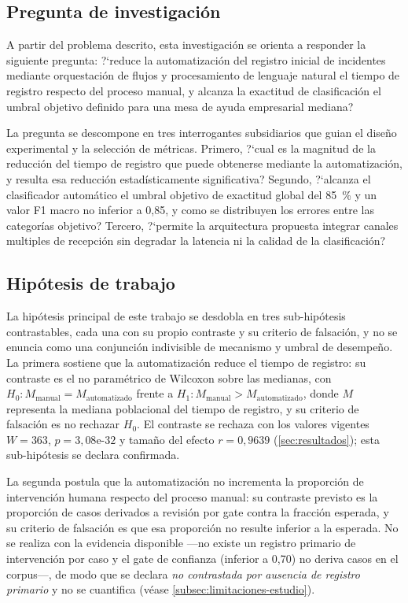\subsection{Pregunta de investigación}\label{subsec:pregunta-investigacion}

A partir del problema descrito, esta investigación se orienta a responder la siguiente pregunta: ?`reduce la automatización del registro inicial de incidentes mediante orquestación de flujos y procesamiento de lenguaje natural el tiempo de registro respecto del proceso manual, y alcanza la exactitud de clasificación el umbral objetivo definido para una mesa de ayuda empresarial mediana?

La pregunta se descompone en tres interrogantes subsidiarios que guian el diseño experimental y la selección de métricas. Primero, ?`cual es la magnitud de la reducción del tiempo de registro que puede obtenerse mediante la automatización, y resulta esa reducción estadísticamente significativa? Segundo, ?`alcanza el clasificador automático el umbral objetivo de exactitud global del 85~\% y un valor F1 macro no inferior a 0,85, y como se distribuyen los errores entre las categorías objetivo? Tercero, ?`permite la arquitectura propuesta integrar canales multiples de recepción sin degradar la latencia ni la calidad de la clasificación?

\subsection{Hipótesis de trabajo}\label{subsec:hipotesis-trabajo}

La hipótesis principal de este trabajo se desdobla en tres sub-hipótesis contrastables, cada una con su propio contraste y su criterio de falsación, y no se enuncia como una conjunción indivisible de mecanismo y umbral de desempeño. La primera sostiene que la automatización reduce el tiempo de registro: su contraste es el no paramétrico de Wilcoxon sobre las medianas, con \(H_{0}: M_{\text{manual}} = M_{\text{automatizado}}\) frente a \(H_{1}: M_{\text{manual}} > M_{\text{automatizado}}\), donde \(M\) representa la mediana poblacional del tiempo de registro, y su criterio de falsación es no rechazar \(H_{0}\). El contraste se rechaza con los valores vigentes \(W = 363\), \(p = 3{,}08\text{e-}32\) y tamaño del efecto \(r = 0{,}9639\) (\autoref{sec:resultados}); esta sub-hipótesis se declara confirmada.

La segunda postula que la automatización no incrementa la proporción de intervención humana respecto del proceso manual: su contraste previsto es la proporción de casos derivados a revisión por gate contra la fracción esperada, y su criterio de falsación es que esa proporción no resulte inferior a la esperada. No se realiza con la evidencia disponible ---no existe un registro primario de intervención por caso y el gate de confianza (inferior a 0,70) no deriva casos en el corpus---, de modo que se declara \emph{no contrastada por ausencia de registro primario} y no se cuantifica (véase \autoref{subsec:limitaciones-estudio}).

